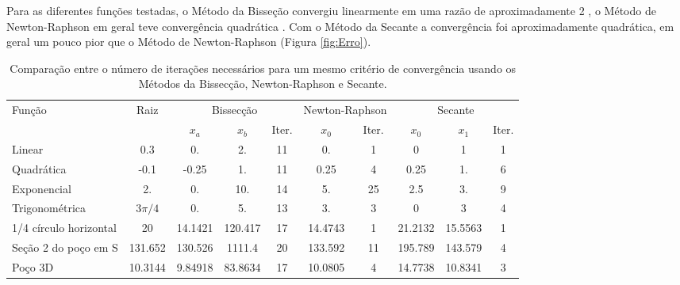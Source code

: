 \documentclass[final,5p]{elsarticle}
\numberwithin{equation}{section}
\begin{document}
    Para as diferentes funções testadas, o Método da Bisseção convergiu linearmente em uma razão de aproximadamente 2 \cite{relatoriobisseccao}, o Método de Newton-Raphson em geral teve convergência quadrática \cite{relatorionewtonraphson}. Com o Método da Secante a convergência foi aproximadamente quadrática, em geral um pouco pior que o Método de Newton-Raphson (Figura \ref{fig:Erro}). 

    \begin{table*} 
        \caption{Comparação entre o número de iterações necessários para um mesmo critério de convergência usando os Métodos da Bissecção, Newton-Raphson e Secante.}
        \begin{tabular}{ l c c c c c c c c c}
            \hline
            \multirow{2}{*}{Função} & \multirow{2}{*}{Raiz} & \multicolumn{3}{c}{Bissecção} & \multicolumn{2}{c}{Newton-Raphson} & \multicolumn{3}{c}{Secante}\\
            &  & $x_a$ & $x_b$ & Iter. & $x_0$ & Iter. & $x_0$ & $x_1$ & Iter. \\ 
            \hline
            Linear & 0.3 & 0. & 2. &  11 & 0. & 1 & 0 & 1 & 1\\
            Quadrática & -0.1 & -0.25 & 1. & 11 & 0.25 & 4 & 0.25 & 1. & 6 \\
            Exponencial  & 2. & 0. & 10. & 14 & 5. & 25 & 2.5 & 3. & 9 \\
            Trigonométrica & $3\pi/4$ & 0. & 5. & 13 & 3. & 3 & 0 & 3 & 4 \\
            1/4 círculo horizontal & 20 & 14.1421 & 120.417 & 17 & 14.4743 & 1 & 21.2132 & 15.5563 & 1 \\
            Seção 2 do poço em S & 131.652 & 130.526 & 1111.4 & 20 & 133.592 & 11 & 195.789 & 143.579 & 4 \\
            Poço 3D & 10.3144 & 9.84918 & 83.8634 & 17 & 10.0805 & 4 & 14.7738 & 10.8341 & 3 \\
            \hline
        \end{tabular}
        \label{table:iteracoes}
    \end{table*}
    
\end{document}
